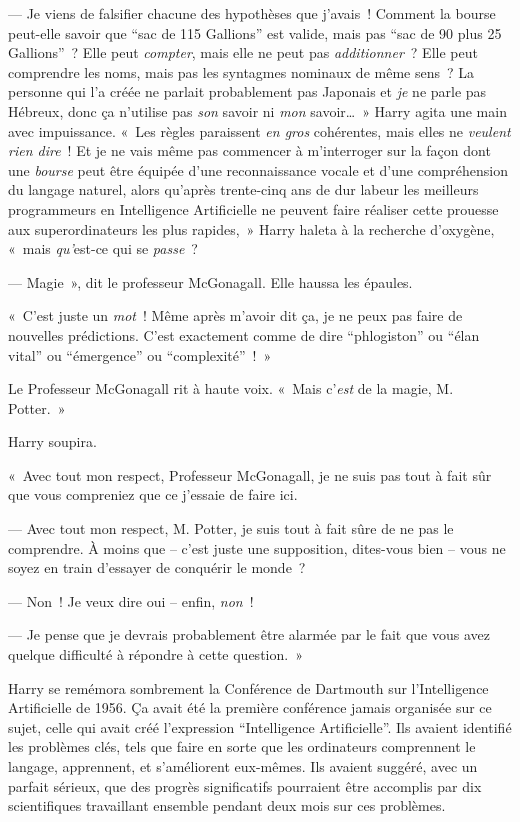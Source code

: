 --- Je viens de falsifier chacune des hypothèses que j'avais~! Comment la bourse peut-elle savoir que “sac de 115 Gallions” est valide, mais pas “sac de 90 plus 25 Gallions”~? Elle peut \emph{compter}, mais elle ne peut pas \emph{additionner}~? Elle peut comprendre les noms, mais pas les syntagmes nominaux de même sens~? La personne qui l'a créée ne parlait probablement pas Japonais et \emph{je} ne parle pas Hébreux, donc ça n'utilise pas \emph{son} savoir ni \emph{mon} savoir…~» Harry agita une main avec impuissance. «~Les règles paraissent \emph{en gros} cohérentes, mais elles ne \emph{veulent rien dire}~! Et je ne vais même pas commencer à m'interroger sur la façon dont une \emph{bourse} peut être équipée d'une reconnaissance vocale et d'une compréhension du langage naturel, alors qu'après trente-cinq ans de dur labeur les meilleurs programmeurs en Intelligence Artificielle ne peuvent faire réaliser cette prouesse aux superordinateurs les plus rapides,~» Harry haleta à la recherche d'oxygène, «~mais \emph{qu'}est-ce qui se \emph{passe}~?

--- Magie~», dit le professeur McGonagall. Elle haussa les épaules.

«~C'est juste un \emph{mot}~! Même après m'avoir dit ça, je ne peux pas faire de nouvelles prédictions. C'est exactement comme de dire “phlogiston” ou “élan vital” ou “émergence” ou “complexité”~!~»

Le Professeur McGonagall rit à haute voix. «~Mais c'\emph{est} de la magie, M. Potter.~»

Harry soupira.

«~Avec tout mon respect, Professeur McGonagall, je ne suis pas tout à fait sûr que vous compreniez que ce j'essaie de faire ici.

--- Avec tout mon respect, M. Potter, je suis tout à fait sûre de ne pas le comprendre. À moins que -- c'est juste une supposition, dites-vous bien -- vous ne soyez en train d'essayer de conquérir le monde~?

--- Non~! Je veux dire oui -- enfin, \emph{non}~!

--- Je pense que je devrais probablement être alarmée par le fait que vous avez quelque difficulté à répondre à cette question.~»

Harry se remémora sombrement la Conférence de Dartmouth sur l'Intelligence Artificielle de 1956. Ça avait été la première conférence jamais organisée sur ce sujet, celle qui avait créé l'expression “Intelligence Artificielle”. Ils avaient identifié les problèmes clés, tels que faire en sorte que les ordinateurs comprennent le langage, apprennent, et s'améliorent eux-mêmes. Ils avaient suggéré, avec un parfait sérieux, que des progrès significatifs pourraient être accomplis par dix scientifiques travaillant ensemble pendant deux mois sur ces problèmes.

